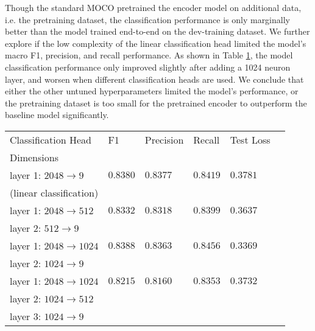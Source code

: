 \documentclass[12pt,twoside]{report}
\begin{document}
Though the standard MOCO pretrained the encoder model on additional data, i.e. the pretraining dataset, the classification performance is only marginally better than the model trained end-to-end on the dev-training dataset. We further explore if the low complexity of the linear classification head limited the model's macro F1, precision, and recall performance. As shown in Table \ref{tab:MOCO_multimlp}, the model classification performance only improved slightly after adding a 1024 neuron layer, and worsen when different classification heads are used. We conclude that either the other untuned hyperparameters limited the model's performance, or the pretraining dataset is too small for the pretrained encoder to outperform the baseline model significantly. \\


\begin{table}[]
    \centering
    \begin{tabular}{llllll}
    \toprule
    Classification Head & F1 & Precision & Recall & Test Loss \\
    Dimensions & & & & \\
    \midrule
    layer 1: $2048 \to 9$ & $0.8380$ & $0.8377$ & $0.8419$ & $0.3781$\\
    (linear classification)\\
    \midrule
    layer 1: $2048 \to 512$ & $0.8332$ & $0.8318$ & $0.8399$ & $0.3637$ \\
    layer 2: $512 \to 9$ \\
    \midrule
    layer 1: $2048 \to 1024$ & $0.8388$ & $0.8363$ & $0.8456$ & $0.3369$\\
    layer 2: $1024 \to 9$ \\
    \midrule
    layer 1: $2048 \to 1024$ & $0.8215$ & $0.8160$ & $0.8353$ & $0.3732$\\
    layer 2: $1024 \to 512$ \\
    layer 3: $1024 \to 9$ \\
    \bottomrule
    \end{tabular}
    \captionsetup{type=table}
    \label{tab:MOCO_multimlp}
\end{table}
\end{document}
